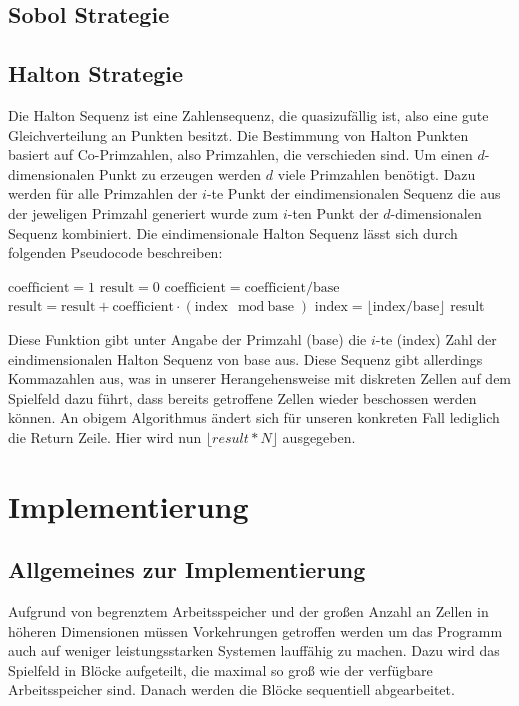 \documentclass[a4paper,12pt]{llncs}
\numberwithin{equation}{section}
\begin{document}
\subsection{Sobol Strategie}

\subsection{Halton Strategie}
Die Halton Sequenz ist eine Zahlensequenz, die quasizufällig ist, also eine gute Gleichverteilung an Punkten besitzt. Die Bestimmung von Halton Punkten basiert auf Co-Primzahlen, also Primzahlen, die verschieden sind. Um einen $d$-dimensionalen Punkt zu erzeugen werden $d$ viele Primzahlen benötigt. Dazu werden für alle Primzahlen der $i$-te Punkt der eindimensionalen Sequenz die aus der jeweligen Primzahl generiert wurde zum $i$-ten Punkt der $d$-dimensionalen Sequenz kombiniert. Die eindimensionale Halton Sequenz lässt sich durch folgenden Pseudocode beschreiben:

\begin{tcolorbox}
	\begin{algorithmic}
		\State $\text{coefficient} = 1$
		\State $ \text{result} = 0$
		\State $\text{coefficient} = \text{coefficient} / \text{base}$
		\State $\text{result} = \text{result} + \text{coefficient} \cdot (\text{index}\mod \text{base})$
		\State $\text{index} = \lfloor \text{index}/\text{base} \rfloor $
		\EndWhile
		\State \Return result
		\EndFunction
	\end{algorithmic}
\end{tcolorbox}

Diese Funktion gibt unter Angabe der Primzahl (base) die $i$-te (index) Zahl der eindimensionalen Halton Sequenz von base aus. Diese Sequenz gibt allerdings Kommazahlen aus, was in unserer Herangehensweise mit diskreten Zellen auf dem Spielfeld dazu führt, dass bereits getroffene Zellen wieder beschossen werden können. An obigem Algorithmus ändert sich für unseren konkreten Fall lediglich die Return Zeile. Hier wird nun $\lfloor result * N \rfloor$ ausgegeben.

\section{Implementierung}

\subsection{Allgemeines zur Implementierung}
Aufgrund von begrenztem Arbeitsspeicher und der großen Anzahl an Zellen in höheren Dimensionen müssen Vorkehrungen getroffen werden um das Programm auch auf weniger leistungsstarken Systemen lauffähig zu machen. Dazu wird das Spielfeld in Blöcke aufgeteilt, die maximal so groß wie der verfügbare Arbeitsspeicher sind. Danach werden die Blöcke sequentiell abgearbeitet. 
\end{document}
